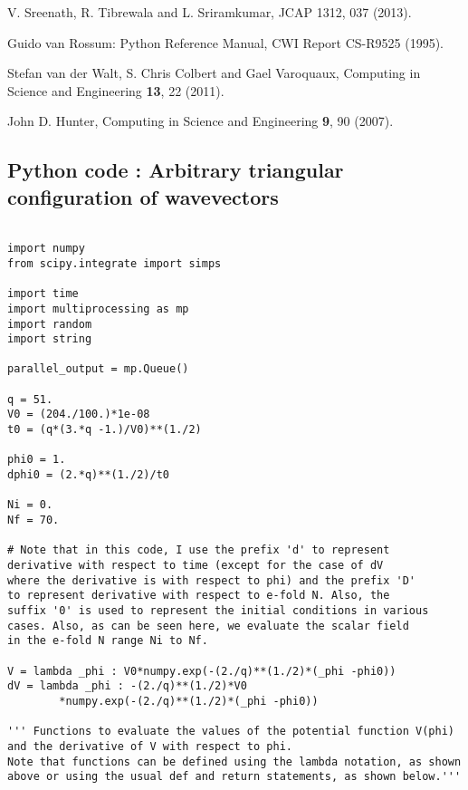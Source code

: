 \documentclass[12pt,a4paper,oneside]{book}
\begin{document}
\begin{thebibliography}{99}
V. Sreenath, R. Tibrewala and L. Sriramkumar, JCAP 1312, 037 (2013).

Guido van Rossum: Python Reference Manual, CWI Report 
CS-R9525 (1995).

Stefan van der Walt, S. Chris Colbert and Gael Varoquaux, 
Computing in Science and Engineering {\bf 13}, 22 (2011).

John D. Hunter, Computing in Science and Engineering {\bf 9}, 90 (2007).



\end{thebibliography}

\begin{appendices}
\chapter{Python code : Arbitrary triangular configuration of wavevectors}

\begin{small}
\begin{verbatim}

import numpy
from scipy.integrate import simps

import time
import multiprocessing as mp
import random
import string

parallel_output = mp.Queue()

q = 51.
V0 = (204./100.)*1e-08
t0 = (q*(3.*q -1.)/V0)**(1./2)

phi0 = 1.
dphi0 = (2.*q)**(1./2)/t0

Ni = 0.
Nf = 70.

# Note that in this code, I use the prefix 'd' to represent 
derivative with respect to time (except for the case of dV 
where the derivative is with respect to phi) and the prefix 'D' 
to represent derivative with respect to e-fold N. Also, the 
suffix '0' is used to represent the initial conditions in various 
cases. Also, as can be seen here, we evaluate the scalar field 
in the e-fold N range Ni to Nf.

V = lambda _phi : V0*numpy.exp(-(2./q)**(1./2)*(_phi -phi0))
dV = lambda _phi : -(2./q)**(1./2)*V0
		*numpy.exp(-(2./q)**(1./2)*(_phi -phi0))

''' Functions to evaluate the values of the potential function V(phi)
and the derivative of V with respect to phi.
Note that functions can be defined using the lambda notation, as shown 
above or using the usual def and return statements, as shown below.'''


\end{verbatim}
\end{small}
\end{appendices}
\end{document}
